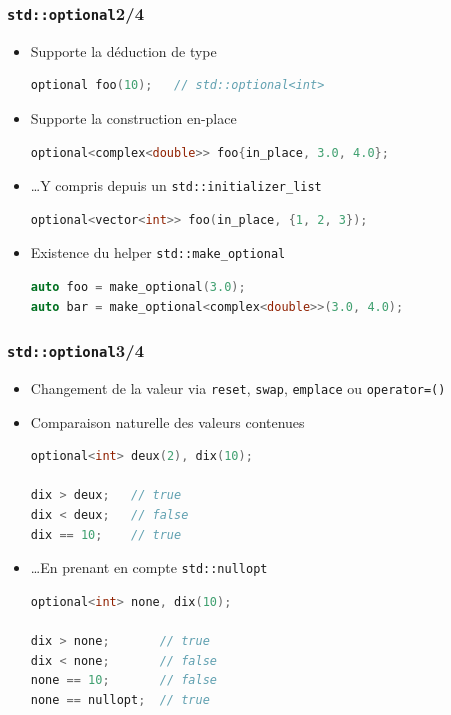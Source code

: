 \documentclass[C++.tex]{subfiles}
\begin{document}
\begin{frame}[fragile]
	\frametitle{\lstinline|std::optional|\titlehfill{}2/4}
	\begin{itemize}
		\item Supporte la déduction de type

	\begin{lstlisting}[language=C++]
optional foo(10);	// std::optional<int>\end{lstlisting}

		\item Supporte la construction \og en-place\fg{}
		
	\begin{lstlisting}[language=C++]
optional<complex<double>> foo{in_place, 3.0, 4.0};\end{lstlisting}
		
		\item \ldots Y compris depuis un \lstinline|std::initializer_list|
	\begin{lstlisting}[language=C++]
optional<vector<int>> foo(in_place, {1, 2, 3});\end{lstlisting}

		\item Existence du helper \lstinline|std::make_optional|
		
	\begin{lstlisting}[language=C++]
auto foo = make_optional(3.0);
auto bar = make_optional<complex<double>>(3.0, 4.0);\end{lstlisting}
	\end{itemize}
\end{frame}

\begin{frame}[fragile]
	\frametitle{\lstinline|std::optional|\titlehfill{}3/4}
	\begin{itemize}
		\item Changement de la valeur via \lstinline|reset|, \lstinline|swap|, \lstinline|emplace| ou \lstinline|operator=()|
		\item Comparaison naturelle des valeurs contenues 

		\begin{lstlisting}[language=C++]
optional<int> deux(2), dix(10);

dix > deux;   // true	
dix < deux;   // false
dix == 10;    // true\end{lstlisting}

		\item \ldots En prenant en compte \lstinline|std::nullopt|

		\begin{lstlisting}[language=C++]
optional<int> none, dix(10);

dix > none;       // true	
dix < none;       // false
none == 10;       // false
none == nullopt;  // true\end{lstlisting}


	\end{itemize}
\end{frame}
\end{document}

